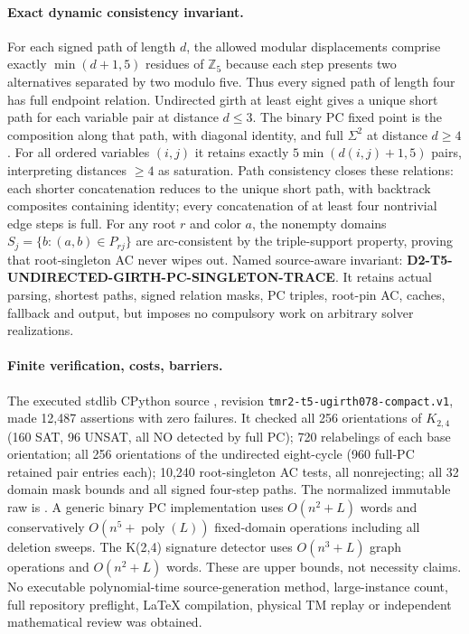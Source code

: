 \documentclass[11pt]{article}
\begin{document}
\paragraph{Exact dynamic consistency invariant.}
For each signed path of length $d$, the allowed modular
displacements comprise exactly $\min(d+1,5)$
residues of $\mathbb{Z}_5$ because each step presents
two alternatives separated by two modulo five.
Thus every signed path of length four has full
endpoint relation. Undirected girth at least eight
gives a unique short path for each variable pair
at distance $d\le3$. The binary PC fixed point is
the composition along that path, with diagonal identity,
and full $\Sigma^2$ at distance $d\ge4$. For all
ordered variables $(i,j)$ it retains exactly
$5\min(d(i,j)+1,5)$ pairs, interpreting distances
$\ge4$ as saturation. Path consistency closes these
relations: each shorter concatenation reduces to the
unique short path, with backtrack composites containing
identity; every concatenation of at least four
nontrivial edge steps is full.
For any root $r$ and color $a$, the nonempty domains
$S_j=\{b:(a,b)\in P_{rj}\}$ are arc-consistent
by the triple-support property, proving that
root-singleton AC never wipes out.
Named source-aware invariant:
\textbf{D2-T5-UNDIRECTED-GIRTH-PC-SINGLETON-TRACE}.
It retains actual parsing, shortest paths, signed
relation masks, PC triples, root-pin AC, caches,
fallback and output, but imposes no compulsory work
on arbitrary solver realizations.

\paragraph{Finite verification, costs, barriers.}
The executed stdlib CPython source
,
revision \texttt{tmr2-t5-ugirth078-compact.v1},
made 12,487 assertions with zero failures.
It checked all 256 orientations of $K_{2,4}$
(160 SAT, 96 UNSAT, all NO detected by full PC);
720 relabelings of each base orientation;
all 256 orientations of the undirected eight-cycle
(960 full-PC retained pair entries each);
10,240 root-singleton AC tests, all nonrejecting;
all 32 domain mask bounds and all signed four-step paths.
The normalized immutable raw is
.
A generic binary PC implementation uses
$O(n^2+L)$ words and conservatively
$O(n^5+\operatorname{poly}(L))$
fixed-domain operations including all deletion sweeps.
The K(2,4) signature detector uses
$O(n^3+L)$ graph operations and $O(n^2+L)$ words.
These are upper bounds, not necessity claims.
No executable polynomial-time source-generation method,
large-instance count, full repository preflight,
LaTeX compilation, physical TM replay or independent
mathematical review was obtained.
\end{document}
